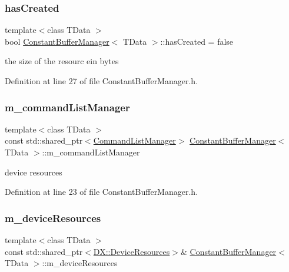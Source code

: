 \subsubsection{\texorpdfstring{has\+Created}{hasCreated}}
{\footnotesize\ttfamily template$<$class T\+Data $>$ \\
bool \mbox{\hyperlink{class_constant_buffer_manager}{Constant\+Buffer\+Manager}}$<$ T\+Data $>$\+::has\+Created = false\hspace{0.3cm}{\ttfamily [private]}}



the size of the resourc ein bytes 



Definition at line 27 of file Constant\+Buffer\+Manager.\+h.

\mbox{\label{class_constant_buffer_manager_aae03042ae999bf171e8dcffefdd4be63}} 
\subsubsection{\texorpdfstring{m\+\_\+command\+List\+Manager}{m\_commandListManager}}
{\footnotesize\ttfamily template$<$class T\+Data $>$ \\
const std\+::shared\+\_\+ptr$<$\mbox{\hyperlink{class_command_list_manager}{Command\+List\+Manager}}$>$ \mbox{\hyperlink{class_constant_buffer_manager}{Constant\+Buffer\+Manager}}$<$ T\+Data $>$\+::m\+\_\+command\+List\+Manager\hspace{0.3cm}{\ttfamily [private]}}



device resources 



Definition at line 23 of file Constant\+Buffer\+Manager.\+h.

\mbox{\label{class_constant_buffer_manager_a9514f5810d4492698ed04c48e67ef7e0}} 
\subsubsection{\texorpdfstring{m\+\_\+device\+Resources}{m\_deviceResources}}
{\footnotesize\ttfamily template$<$class T\+Data $>$ \\
const std\+::shared\+\_\+ptr$<$\mbox{\hyperlink{class_d_x_1_1_device_resources}{D\+X\+::\+Device\+Resources}}$>$\& \mbox{\hyperlink{class_constant_buffer_manager}{Constant\+Buffer\+Manager}}$<$ T\+Data $>$\+::m\+\_\+device\+Resources\hspace{0.3cm}{\ttfamily [private]}}



